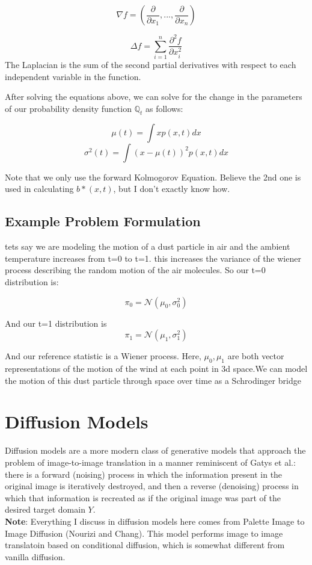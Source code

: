 \documentclass[12pt]{article}
\begin{document}
\[\nabla f = \left(\frac{\partial}{\partial x_1}, ... , \frac{\partial}{\partial x_n}\right)\]

\[\Delta f = \sum_{i=1}^n\frac{\partial^2f}{\partial x_i^2}\]
The Laplacian is the sum of the second partial derivatives with respect to each independent variable in the function.

After solving the equations above, we can solve for the change in the parameters of our probability density function \(\mathbb{Q}_t\) as follows:

\[\mu(t) = \int x p(x,t)dx\]
\[\sigma^2(t)=\int(x - \mu(t))^2p(x,t)dx\]

Note that we only use the forward Kolmogorov Equation. Believe the 2nd one is used in calculating \(b*(x,t)\), but I don't exactly know how. 

\subsection{Example Problem Formulation}
tets say we are modeling the motion of a dust particle in air and the ambient temperature increases from t=0 to t=1. this increases the variance of the wiener process describing the random motion of the air molecules. So our t=0 distribution is:

\[\pi_0 = \mathcal{N}(\mu_0, \sigma_0^2)\]

And our t=1 distribution is 
\[\pi_1 = \mathcal{N}(\mu_1, \sigma_1^2)\]

And our reference statistic is a Wiener process. Here, \(\mu_0, \mu_1\) are both vector representations of the motion of the wind at each point in 3d space.We can model the motion of this dust particle through space over time as a Schrodinger bridge

\section{Diffusion Models}

Diffusion models are a more modern class of generative models that approach the problem of image-to-image translation in a manner reminiscent of Gatys et al.: there is a forward (noising) process in which the information present in the original image is iteratively destroyed, and then a reverse (denoising) process in which that information is recreated as if the original image was part of the desired target domain \(Y\). \\

\textbf{Note}: Everything I discuss in diffusion models here comes from Palette Image to Image Diffusion (Nourizi and Chang). This model performs image to image translatoin based on conditional diffusion, which is somewhat different from vanilla diffusion. 
\end{document}
